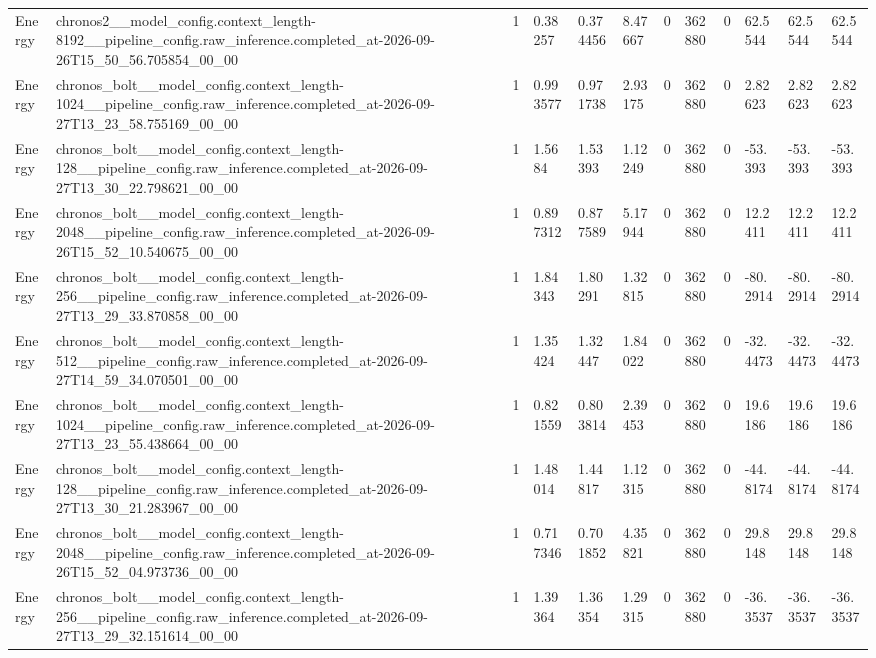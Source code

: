 \begin{tabular}{llllllllllll}
Energy & chronos2\_\_model\_config.context\_length-8192\_\_pipeline\_config.raw\_inference.completed\_at-2026-09-26T15\_50\_56.705854\_00\_00 & 1 & 0.38257 & 0.374456 & 8.47667 & 0 & 362880 & 0 & 62.5544 & 62.5544 & 62.5544 \\
Energy & chronos\_bolt\_\_model\_config.context\_length-1024\_\_pipeline\_config.raw\_inference.completed\_at-2026-09-27T13\_23\_58.755169\_00\_00 & 1 & 0.993577 & 0.971738 & 2.93175 & 0 & 362880 & 0 & 2.82623 & 2.82623 & 2.82623 \\
Energy & chronos\_bolt\_\_model\_config.context\_length-128\_\_pipeline\_config.raw\_inference.completed\_at-2026-09-27T13\_30\_22.798621\_00\_00 & 1 & 1.5684 & 1.53393 & 1.12249 & 0 & 362880 & 0 & -53.393 & -53.393 & -53.393 \\
Energy & chronos\_bolt\_\_model\_config.context\_length-2048\_\_pipeline\_config.raw\_inference.completed\_at-2026-09-26T15\_52\_10.540675\_00\_00 & 1 & 0.897312 & 0.877589 & 5.17944 & 0 & 362880 & 0 & 12.2411 & 12.2411 & 12.2411 \\
Energy & chronos\_bolt\_\_model\_config.context\_length-256\_\_pipeline\_config.raw\_inference.completed\_at-2026-09-27T13\_29\_33.870858\_00\_00 & 1 & 1.84343 & 1.80291 & 1.32815 & 0 & 362880 & 0 & -80.2914 & -80.2914 & -80.2914 \\
Energy & chronos\_bolt\_\_model\_config.context\_length-512\_\_pipeline\_config.raw\_inference.completed\_at-2026-09-27T14\_59\_34.070501\_00\_00 & 1 & 1.35424 & 1.32447 & 1.84022 & 0 & 362880 & 0 & -32.4473 & -32.4473 & -32.4473 \\
Energy & chronos\_bolt\_\_model\_config.context\_length-1024\_\_pipeline\_config.raw\_inference.completed\_at-2026-09-27T13\_23\_55.438664\_00\_00 & 1 & 0.821559 & 0.803814 & 2.39453 & 0 & 362880 & 0 & 19.6186 & 19.6186 & 19.6186 \\
Energy & chronos\_bolt\_\_model\_config.context\_length-128\_\_pipeline\_config.raw\_inference.completed\_at-2026-09-27T13\_30\_21.283967\_00\_00 & 1 & 1.48014 & 1.44817 & 1.12315 & 0 & 362880 & 0 & -44.8174 & -44.8174 & -44.8174 \\
Energy & chronos\_bolt\_\_model\_config.context\_length-2048\_\_pipeline\_config.raw\_inference.completed\_at-2026-09-26T15\_52\_04.973736\_00\_00 & 1 & 0.717346 & 0.701852 & 4.35821 & 0 & 362880 & 0 & 29.8148 & 29.8148 & 29.8148 \\
Energy & chronos\_bolt\_\_model\_config.context\_length-256\_\_pipeline\_config.raw\_inference.completed\_at-2026-09-27T13\_29\_32.151614\_00\_00 & 1 & 1.39364 & 1.36354 & 1.29315 & 0 & 362880 & 0 & -36.3537 & -36.3537 & -36.3537 \\

\end{tabular}

